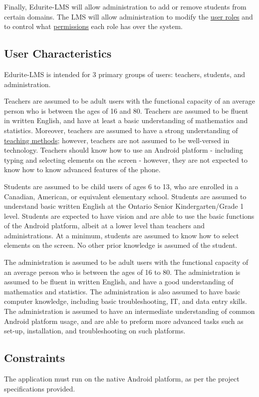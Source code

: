 \documentclass[]{article}
\begin{document}
Finally, Edurite-LMS will allow administration to add or remove students from 
certain domains. The LMS will allow administration to modify the \underline{user roles} and 
to control what \underline{permissions} each role has over the system.

\subsection{User Characteristics}
\label{sub:user_characteristics}
Edurite-LMS is intended for 3 primary groups of users: teachers, students, and 
administration.

Teachers are assumed to be adult users with the functional capacity of an 
average person who is between the ages of 16 and 80. Teachers are assumed to be 
fluent in written English, and have at least a basic understanding of 
mathematics and statistics. Moreover, teachers are assumed to have a strong 
understanding of \underline{teaching methods}; however, teachers are not assumed to be 
well-versed in technology. Teachers should know how to use an Android platform 
- including typing and selecting elements on the screen - however, they are not 
expected to know how to know advanced features of the phone.

Students are assumed to be child users of ages 6 to 13, who are enrolled in a 
Canadian, American, or equivalent elementary school. Students are assumed to 
understand basic written English at the Ontario Senior Kindergarten/Grade 1 
level. Students are expected to have vision and are able to use the basic 
functions of the Android platform, albeit at a lower level than teachers and 
administrations. At a minimum, students are assumed to know how to select 
elements on the screen. No other prior knowledge is assumed of the student.

The administration is assumed to be adult users with the functional capacity of 
an average person who is between the ages of 16 to 80. The administration is 
assumed to be fluent in written English, and have a good understanding of 
mathematics and statistics. The administration is also assumed to have basic 
computer knowledge, including basic troubleshooting, IT, and data entry skills. 
The administration is assumed to have an intermediate understanding of common 
Android platform usage, and are able to preform more advanced tasks such as 
set-up, installation, and troubleshooting on such platforms. 

\subsection{Constraints}
\label{sub:constraints}
The application must run on the native Android platform, as per the project 
specifications provided.
\end{document}
